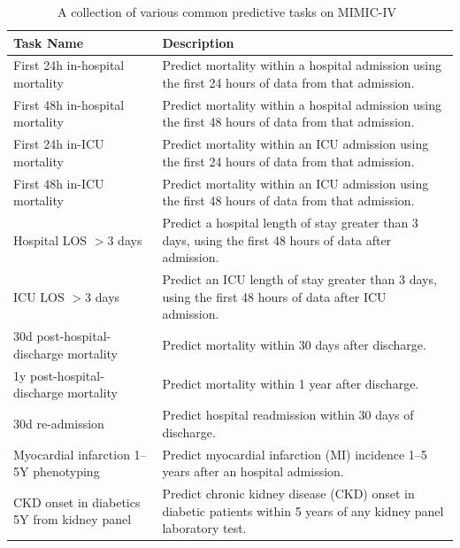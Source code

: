 \begin{table}[htbp]
\centering
\caption{A collection of various common predictive tasks on MIMIC-IV~\cite{mcdermott_mimic-iv_2025}}
\label{tab:paper3_mimic-tasks}
\begin{tabularx}{\textwidth}{>{\raggedright\arraybackslash}p{} >{\raggedright\arraybackslash}X}
\toprule
\textbf{Task Name} & \textbf{Description} \\
\midrule
First 24h in-hospital mortality & Predict mortality within a hospital admission using the first 24 hours of data from that admission. \\
First 48h in-hospital mortality & Predict mortality within a hospital admission using the first 48 hours of data from that admission. \\
First 24h in-ICU mortality & Predict mortality within an ICU admission using the first 24 hours of data from that admission. \\
First 48h in-ICU mortality & Predict mortality within an ICU admission using the first 48 hours of data from that admission. \\
Hospital LOS $>$3 days & Predict a hospital length of stay greater than 3 days, using the first 48 hours of data after admission.%
\\
ICU LOS $>$3 days & Predict an ICU length of stay greater than 3 days, using the first 48 hours of data after ICU admission.%
\\
30d post-hospital-discharge mortality & Predict mortality within 30 days after discharge. \\
1y post-hospital-discharge mortality & Predict mortality within 1 year after discharge. \\
30d re-admission & Predict hospital readmission within 30 days of discharge. \\
Myocardial infarction 1--5Y phenotyping & Predict myocardial infarction (MI) incidence 1--5 years after an hospital admission. \\
CKD onset in diabetics 5Y from kidney panel & Predict chronic kidney disease (CKD) onset in diabetic patients within 5 years of any kidney panel laboratory test. \\
\bottomrule
\end{tabularx}
\end{table}
 
